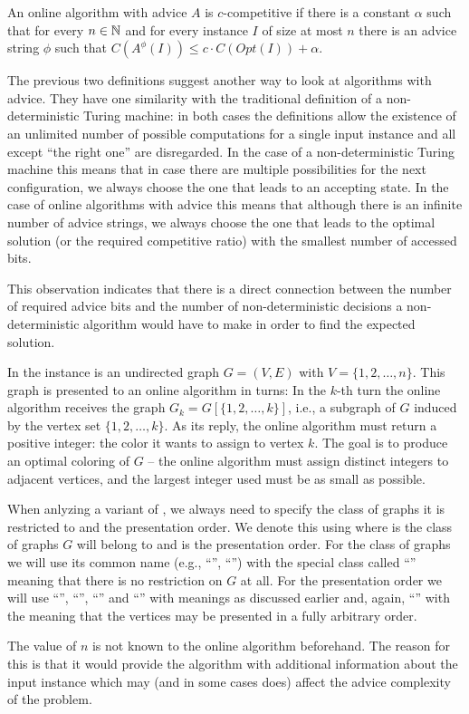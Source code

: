 \begin{definition}\label{def:advice-competitive}
    An online algorithm with advice $A$ is $c$-competitive if there is a
    constant $\alpha$ such that for every $n \in \mathbb{N}$ and for every
    instance $I$ of size at most $n$ there is an advice string $\phi$ such
    that $C(A^\phi(I)) \leq c \cdot C(Opt(I)) + \alpha$.
\end{definition}

The previous two definitions suggest another way to look at algorithms
with advice. They have one similarity with the traditional definition of a
non-deterministic Turing machine: in both cases the definitions allow the
existence of an unlimited number of possible computations for a single
input instance and all except ``the right one'' are disregarded. In the
case of a non-deterministic Turing machine this means that in case there
are multiple possibilities for the next configuration, we always choose
the one that leads to an accepting state. In the case of online algorithms
with advice this means that although there is an infinite number of advice
strings, we always choose the one that leads to the optimal solution (or
the required competitive ratio) with the smallest number of accessed bits.

This observation indicates that there is a direct connection between the
number of required advice bits and the number of non-deterministic
decisions a non-deterministic algorithm would have to make in order to
find the expected solution.

\begin{definition}\label{def:graph-coloring}
    In  the instance is an undirected graph $G =
    (V, E)$ with $V = \{1, 2, \dots, n\}$. This graph is presented to an
    online algorithm in turns: In the $k$-th turn the online algorithm
    receives the graph $G_k = G[\{1, 2, \dots, k\}]$, i.e., a subgraph of
    $G$ induced by the vertex set $\{1, 2, \dots, k\}$.  As its reply, the
    online algorithm must return a positive integer: the color it wants to
    assign to vertex $k$. The goal is to produce an optimal coloring of
    $G$ -- the online algorithm must assign distinct integers to adjacent
    vertices, and the largest integer used must be as small as possible.
\end{definition}

When anlyzing a variant of , we always need to
specify the class of graphs it is restricted to and the presentation
order. We denote this using  where  is the class
of graphs $G$ will belong to and  is the presentation order.
For the class of graphs we will use its common name (e.g.,
``'', ``'') with the special class
called ``'' meaning that there is no restriction on $G$ at
all. For the presentation order we will use ``'',
``'', ``'' and ``'' with
meanings as discussed earlier and, again, ``'' with the
meaning that the vertices may be presented in a fully arbitrary order.

The value of $n$ is not known to the online algorithm beforehand. The
reason for this is that it would provide the algorithm with additional
information about the input instance which may (and in some cases does)
affect the advice complexity of the problem.
